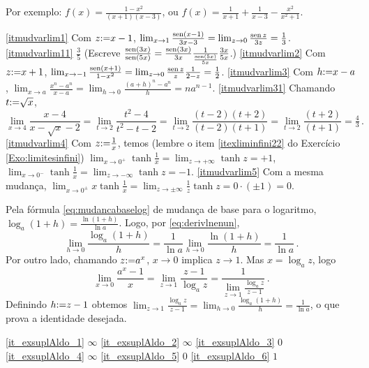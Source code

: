 \begin{Solution}{4.26}
Por exemplo: $f(x)=\frac{1-x^2}{(x+1)(x-3)}$, ou $f(x)=\frac{1}{x+1}
+\frac{1}{x-3}-\frac{x^2}{x^2+1}$.
\end{Solution}
\begin{Solution}{4.27}
\eqref{itmudvarlim1} Com $z{:=} x-1$, $\lim_{x\to 1}\frac{\operatorname{sen}
(x-1)}{3x-3}=\lim_{z\to 0}\frac{\operatorname{sen}
z}{3z}=\frac13$.
\eqref{itmudvarlim11} $\frac35$ (Escreve $\frac{\operatorname{sen} (3x)}{\operatorname{sen} (5x)}=\frac{\operatorname{sen} (3x)}{3x}\frac{1}{\frac{\operatorname{sen} (5x)}{5x}}\frac{3x}{5x}$.)
\eqref{itmudvarlim2} Com $z{:=} x+1$, $\lim_{x\to
-1}\frac{\operatorname{sen}(x+1)}{1-x^2}=\lim_{z\to
0}\frac{\operatorname{sen} z}{z}\frac{1}{2-z}=\frac12$.
\eqref{itmudvarlim3} Com $h{:=} x-a$,
$\lim_{x\to a}\frac{x^n-a^n}{x-a}=\lim_{h\to
0}\frac{(a+h)^n-a^n}{h}=na^{n-1}$.
\eqref{itmudvarlim31} Chamando $t{:=} \sqrt{x}$,
$$\lim_{x\to 4}\frac{x-4}{x-\sqrt{x}-2}=\lim_{t\to 2}\frac{t^2-4}{t^2-t-2}=\lim_{t\to 2}\frac{(t-2)(t+2)}{(t-2)(t+1)}=\lim_{t\to 2}\frac{(t+2)}{(t+1)}=\tfrac43\,.$$
\eqref{itmudvarlim4} Com $z{:=} \frac{1}{x}$, temos (lembre o
item \eqref{itexliminfini22} do Exercício \ref{Exo:limitesinfini})
 $\lim_{x\to 0^+}\tanh \frac{1}{x}=\lim_{z\to +\infty}\tanh z=+1$,
$\lim_{x\to 0^-}\tanh \frac{1}{x}=\lim_{z\to -\infty}\tanh z=-1$.
\eqref{itmudvarlim5} Com a mesma mudança,
$\lim_{x\to 0^\pm}x\tanh \frac{1}{x}=\lim_{z\to \pm
\infty}\frac{1}{z}\tanh{z}=0\cdot (\pm 1)=0$.
\end{Solution}
\begin{Solution}{4.28}
Pela fórmula \eqref{eq:mudancabaselog} de mudança de base para o
logaritmo, $\log_a(1+h)=\frac{\ln(1+h)}{\ln a}$. Logo, por
\eqref{eq:derivlnenun},
$$\lim_{h\to 0}\frac{\log_a(1+h)}{h}=\frac{1}{\ln a}\lim_{h\to
0}\frac{\ln(1+h)}{h}=\frac{1}{\ln a}\,.$$
Por outro lado, chamando $z{:=} a^x$, $x\to 0$ implica $z\to 1$.
Mas $x=\log_az$, logo
$$
\lim_{x\to
0}\frac{a^x-1}{x}=\lim_{z\to 1}\frac{z-1}{\log_a
z}=\frac{1}{\lim_{z\to 1}\frac{\log_az}{z-1}}\,.
$$
Definindo $h{:=} z-1$ obtemos $\lim_{z\to
1}\frac{\log_az}{z-1}=\lim_{h\to 0}\frac{\log_a(1+h)}{h}=\frac{1}{\ln
a}$, o que prova a identidade desejada.
\end{Solution}
\begin{Solution}{4.29}
\eqref{it_exsuplAldo_1} $\infty$
\eqref{it_exsuplAldo_2} $\infty$
\eqref{it_exsuplAldo_3} $0$
\eqref{it_exsuplAldo_4} $\infty$
\eqref{it_exsuplAldo_5} $0$
\eqref{it_exsuplAldo_6} $1$
\end{Solution}
